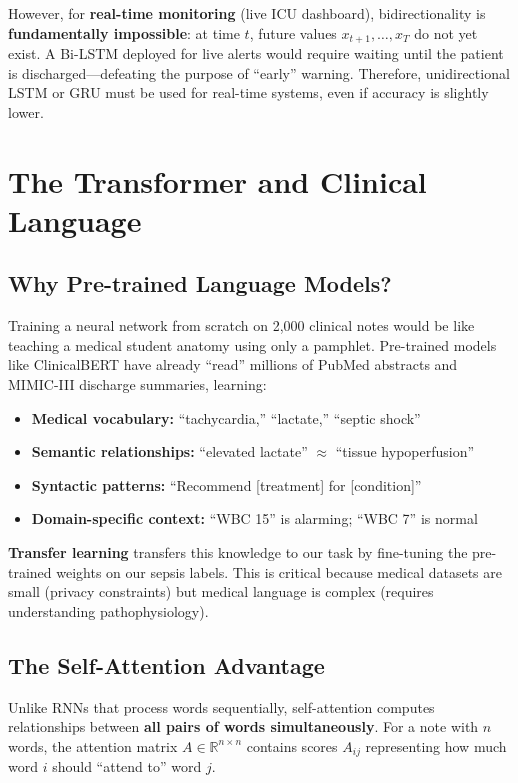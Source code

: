 \documentclass[11pt,a4paper]{article}
\begin{document}
However, for \textbf{real-time monitoring} (live ICU dashboard), bidirectionality is \textbf{fundamentally impossible}: at time $t$, future values $x_{t+1}, \dots, x_T$ do not yet exist. A Bi-LSTM deployed for live alerts would require waiting until the patient is discharged---defeating the purpose of ``early'' warning. Therefore, unidirectional LSTM or GRU must be used for real-time systems, even if accuracy is slightly lower.

\section{The Transformer and Clinical Language}

\subsection{Why Pre-trained Language Models?}

Training a neural network from scratch on 2,000 clinical notes would be like teaching a medical student anatomy using only a pamphlet. Pre-trained models like ClinicalBERT have already ``read'' millions of PubMed abstracts and MIMIC-III discharge summaries, learning:

\begin{itemize}
\item \textbf{Medical vocabulary:} ``tachycardia,'' ``lactate,'' ``septic shock''
\item \textbf{Semantic relationships:} ``elevated lactate'' $\approx$ ``tissue hypoperfusion''
\item \textbf{Syntactic patterns:} ``Recommend [treatment] for [condition]''
\item \textbf{Domain-specific context:} ``WBC 15'' is alarming; ``WBC 7'' is normal
\end{itemize}

\textbf{Transfer learning} transfers this knowledge to our task by fine-tuning the pre-trained weights on our sepsis labels. This is critical because medical datasets are small (privacy constraints) but medical language is complex (requires understanding pathophysiology).

\subsection{The Self-Attention Advantage}

Unlike RNNs that process words sequentially, self-attention computes relationships between \textbf{all pairs of words simultaneously}. For a note with $n$ words, the attention matrix $A \in \mathbb{R}^{n \times n}$ contains scores $A_{ij}$ representing how much word $i$ should ``attend to'' word $j$.
\end{document}
